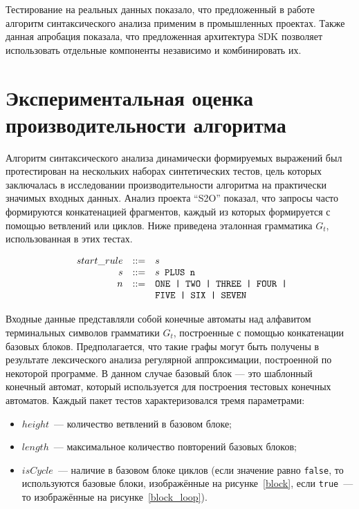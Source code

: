Тестирование на реальных данных показало, что предложенный в работе алгоритм синтаксического анализа применим в промышленных проектах. Также данная апробация показала, что предложенная архитектура SDK позволяет использовать отдельные компоненты независимо и комбинировать их.

\section{Экспериментальная оценка производительности алгоритма}\label{SyntTestsEvalDescr}

Алгоритм синтаксического анализа динамически формируемых выражений был протестирован на нескольких наборах синтетических тестов, цель которых заключалась в исследовании производительности алгоритма на практически значимых входных данных. Анализ  проекта ``S2O'' показал, что запросы часто формируются конкатенацией фрагментов, каждый из которых формируется с помощью ветвлений или циклов. Ниже приведена эталонная грамматика $G_t$, использованная в этих тестах.

$$
\begin{array}{crcl}
& start\_rule &::=& s \\
& s & ::= & s \mbox{\texttt{ PLUS }} \mbox{\texttt{n}}\\
& n & ::= & \mbox{\texttt{ONE | }} \mbox{\texttt{TWO | }} \mbox{\texttt{THREE | }} \mbox{\texttt{FOUR | }} \\
&   &     & \mbox{\texttt{FIVE | }} \mbox{\texttt{SIX | }} \mbox{\texttt{SEVEN}}
\end{array}
$$

Входные данные представляли собой конечные автоматы над алфавитом терминальных символов грамматики $G_t$, построенные с помощью конкатенации базовых блоков. Предполагается, что такие графы могут быть получены в результате лексического анализа регулярной аппроксимации, построенной по некоторой программе. В данном случае базовый блок --- это шаблонный конечный автомат, который используется для построения тестовых конечных автоматов. Каждый пакет тестов характеризовался тремя параметрами: 

\begin{itemize}
  \item $height$~--- количество ветвлений в базовом блоке;
  \item $length$~--- максимальное количество повторений базовых блоков;
  \item $isCycle$~--- наличие в базовом блоке циклов (если значение равно \texttt{false}, то используются базовые блоки, изображённые на рисунке~\ref{block}, если \texttt{true}~--- то изображённые на рисунке~\ref{block_loop}).
\end{itemize}

